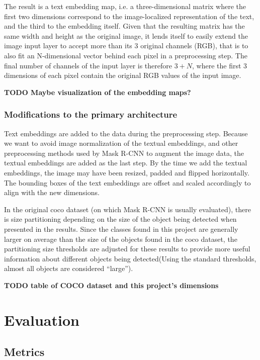 \documentclass[english, bibtex]{kththesis}
\begin{document}
The result is a text embedding map, i.e. a three-dimensional matrix where the first two dimensions correspond to the image-localized representation of the text, and the third to the embedding itself. Given that the resulting matrix has the same width and height as the original image, it lends itself to easily extend the image input layer to accept more than its 3 original channels (RGB), that is to also fit an N-dimensional vector behind each pixel in a preprocessing step. The final number of channels of the input layer is therefore $3+N$, where the first 3 dimensions of each pixel contain the original RGB values of the input image. 

\textbf{TODO Maybe visualization of the embedding maps?}

\subsection{Modifications to the primary architecture}

Text embeddings are added to the data during the preprocessing step. Because we want to avoid image normalization of the textual embeddings, and other preprocessing methods used by Mask R-CNN to augment the image data, the textual embeddings are added as the last step. By the time we add the textual embeddings, the image may have been resized, padded and flipped horizontally. The bounding boxes of the text embeddings are offset and scaled accordingly to align with the new dimensions.

In the original coco dataset (on which Mask R-CNN is usually evaluated), there is size partitioning depending on the size of the object being detected when presented in the results. Since the classes found in this project are generally larger on average than the size of the objects found in the coco dataset, the partitioning size thresholds are adjusted for these results to provide more useful information about different objects being detected(Using the standard thresholds, almost all objects are considered “large”).

\textbf{TODO table of COCO dataset and this project's dimensions}


\chapter{Evaluation}
\label{ch:eval}

\section{Metrics}
\end{document}
